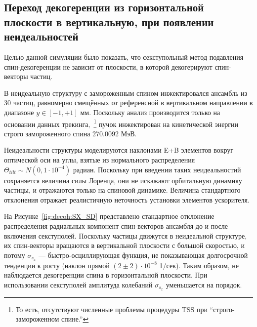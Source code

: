 \subsection{Переход декогеренции из горизонтальной плоскости в вертикальную, при появлении неидеальностей}\label{sec:Decoherence-plane-transfer}
Целью данной симуляции было показать, что секступольный метод подавления спин-декогеренции
не зависит от плоскости, в которой декогерируют спин-векторы частиц.

В неидеальную структуру с замороженным спином инжектировался ансамбль из 30 частиц, равномерно смещённых 
от референсной в вертикальном направлении в диапазоне $y \in [-1, +1]$ мм. Поскольку анализ производится только
на основании данных трекинга,~\footnote{То есть, отсутствуют численные проблемы процедуры TSS  
	при ``строго-замороженном спине.''} пучок инжектирован на кинетической энергии строго замороженного спина
270.0092 МэВ.

Неидеальности структуры моделируются наклонами E+B элементов вокруг оптической оси на углы, 
взятые из нормального распределения ${\Theta_{tilt} \sim N(0, 1\cdot 10^{-4})}$ радиан. 
Поскольку при введении таких неидеальностий сохраняется величина силы Лоренца, они не искажают 
орбитальную динамику частицы, и отражаются только на спиновой динамике. Величина стандартного отклонения
отражает реалистичную неточность установки элементов ускорителя. 

На Рисунке~\ref{fig:decoh:SX_SD} представлено стандартное отклонение распределения 
радиальных компонент спин-векторов ансамбля
до и после включения секступолей. Поскольку частицы движутся в неидеальной структуре, их спин-векторы вращаются
в вертикальной плоскости с большой скоростью, и потому $\sigma_{s_x}$ --- быстро-осциллирующая функция, не
показывающая долгосрочной тенденции к росту (наклон прямой $(2\pm2)\cdot 10^{-8}$ 1/сек). Таким образом, 
не наблюдается декогеренции спина в горизонтальной плоскости. При использовании секступолей 
амплитуда колебаний $\sigma_{s_x}$ уменьшается на порядок.

